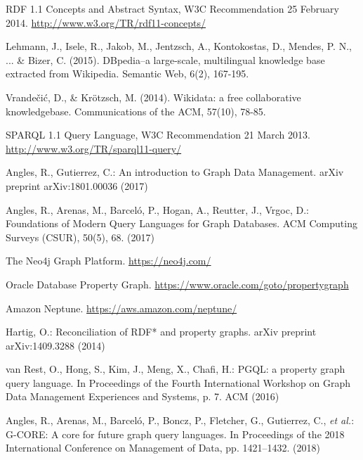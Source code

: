 \documentclass[runningheads]{llncs}
\begin{document}
%
%
%

% 
%
\begin{thebibliography}{8}

RDF 1.1 Concepts and Abstract Syntax, W3C Recommendation 25 February 2014. \url{http://www.w3.org/TR/rdf11-concepts/}

Lehmann, J., Isele, R., Jakob, M., Jentzsch, A., Kontokostas, D., Mendes, P. N., ... & Bizer, C. (2015). DBpedia–a large-scale, multilingual knowledge base extracted from Wikipedia. Semantic Web, 6(2), 167-195.

Vrandečić, D., & Krötzsch, M. (2014). Wikidata: a free collaborative knowledgebase. Communications of the ACM, 57(10), 78-85.

SPARQL 1.1 Query Language, W3C Recommendation 21 March 2013. \url{http://www.w3.org/TR/sparql11-query/}

Angles, R., Gutierrez, C.: An introduction to Graph Data Management. arXiv preprint arXiv:1801.00036 (2017)

Angles, R., Arenas, M., Barceló, P., Hogan, A., Reutter, J., Vrgoc, D.: Foundations of Modern Query Languages for Graph Databases. ACM Computing Surveys (CSUR), 50(5), 68. (2017)

The Neo4j Graph Platform. \url{https://neo4j.com/}

Oracle Database Property Graph. \url{https://www.oracle.com/goto/propertygraph}

Amazon Neptune. \url{https://aws.amazon.com/neptune/}
 
Hartig, O.: Reconciliation of RDF* and property graphs. arXiv preprint arXiv:1409.3288 (2014)

van Rest, O., Hong, S., Kim, J., Meng, X., Chafi, H.: PGQL: a property graph query language. In Proceedings of the Fourth International Workshop on Graph Data Management Experiences and Systems, p. 7. ACM (2016)

Angles, R., Arenas, M., Barceló, P., Boncz, P., Fletcher, G., Gutierrez, C., {\itshape et al.}: G-CORE: A core for future graph query languages. In Proceedings of the 2018 International Conference on Management of Data, pp. 1421--1432. (2018)


\end{thebibliography}
\end{document}
